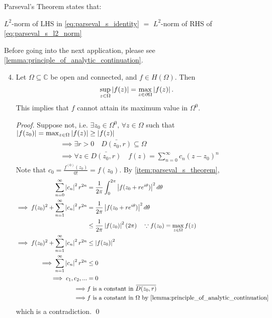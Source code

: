 \documentclass[11pt, oneside]{book}
\begin{document}
\begin{ex}
\begin{enumerate}
			Parseval's Theorem states that:

			$L^2$-norm of LHS in \cref{eq:parseval_s_identity} $=$ $L^2$-norm of RHS of \cref{eq:parseval_s_l2_norm}
	\end{enumerate}

	Before going into the next application, please see \cref{lemma:principle_of_analytic_continuation}.

	\begin{enumerate}
		\setcounter{enumi}{3}
		\item {} Let $\Omega \subseteq \mathbb{C}$ be open and connected, and $f \in H(\Omega)$. Then \label{item:maximum_modulus_principle}
		\begin{equation*}
			\sup_{z \in \Omega} \left|f(z)\right| = \max_{z \in \partial \Omega} \left|f(z)\right|.
		\end{equation*}
		This implies that $f$ cannot attain its maximum value in $\Omega^0$.

			\begin{proof}
				Suppose not, i.e. $\exists z_0 \in \Omega^0, \, \forall z \in \Omega$ such that $\left|f(z_0)\right| = \max_{z \in \Omega} \left|f(z)\right| \geq \left|f(z)\right|$
				\begin{align*}
					&\implies \exists r > 0 \quad \bar{D(z_0, r)} \subseteq \Omega \\
					&\implies \forall z \in \bar{D(z_0, r)} \quad f(z) = \sum_{n=0}^{\infty} c_n (z - z_0)^n
				\end{align*}
				Note that $c_0 = \frac{f^{(0)}(z_0)}{0!} = f(z_0)$. By \cref{item:parseval_s_theorem},
				\begin{align*}
					\sum_{n=0}^{\infty} \abs{c_n}^2 r^{2n} &= \frac{1}{2\pi} \int_{0}^{2 \pi} \abs{f(z_0 + re^{i \theta})}^2 \dif{\theta} \\
					\implies  f(z_0)^2 + \sum_{n=1}^{\infty} \abs{c_n}^2 r^{2n} & = \frac{1}{2 \pi} \abs{f(z_0 + re^{i \theta})}^2 \dif{\theta} \\
					& \leq \frac{1}{2 \pi} \abs{f(z_0)}^2 (2 \pi) \quad \because f(z_0) = \max_{z \in \Omega} f(z) \\
					\implies  f(z_0)^2 + \sum_{n=1}^{\infty} \abs{c_n}^2 r^{2n} & \leq \abs{f(z_0)}^2 \\
					\implies  \sum_{n=1}^{\infty} \abs{c_n}^2 r^{2n} & \leq 0 \\
					\implies c_1, c_2, ... & = 0 \\
					\implies & f \text{ is a constant in } \bar{D(z_0, r)} \\
					\implies & f \text{ is a constant in } \Omega \text{ by } \cref{lemma:principle_of_analytic_continuation}
				\end{align*}
				which is a contradiction. \qed
			\end{proof}
	\end{enumerate}

\end{ex}
\end{document}
